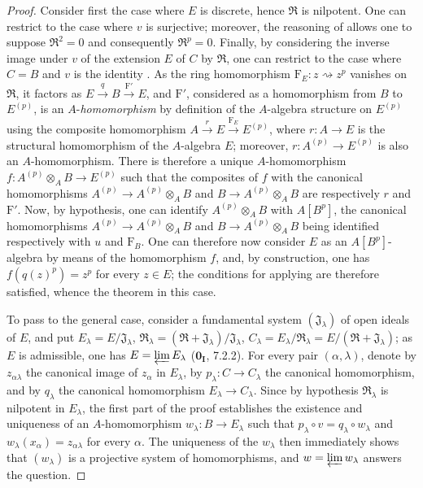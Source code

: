 \begin{proof}
Consider first the case where $E$ is discrete, hence $\mathfrak{R}$ is nilpotent.
One can restrict to the case where $v$ is surjective; moreover, the reasoning of
 allows one to suppose $\mathfrak{R}^2=0$ and consequently
$\mathfrak{R}^p=0$. Finally, by considering the inverse image under $v$ of the
extension $E$ of $C$ by $\mathfrak{R}$, one can restrict to the case where $C=B$
and $v$ is the identity . As the ring homomorphism
$\mathrm{F}_E:z\rightsquigarrow z^p$ vanishes on $\mathfrak{R}$, it factors as
$E\xrightarrow q B\xrightarrow{\mathrm{F}'}E$, and $\mathrm{F}'$, considered as a
homomorphism from $B$ to $E^{(p)}$, is an $A$-\emph{homomorphism} by definition
of the $A$-algebra structure on $E^{(p)}$ using the composite homomorphism
$A\xrightarrow r E\xrightarrow{\mathrm{F}_E}E^{(p)}$, where $r:A\to E$ is the
structural homomorphism of the $A$-algebra $E$; moreover,
$r:A^{(p)}\to E^{(p)}$ is also an $A$-homomorphism. There is therefore a unique
$A$-homomorphism $f:A^{(p)}\otimes_A B\to E^{(p)}$ such that the composites of $f$
with the canonical homomorphisms $A^{(p)}\to A^{(p)}\otimes_A B$ and
$B\to A^{(p)}\otimes_A B$ are respectively $r$ and $\mathrm{F}'$. Now, by hypothesis,
one can identify $A^{(p)}\otimes_A B$ with $A[B^p]$, the canonical homomorphisms
$A^{(p)}\to A^{(p)}\otimes_A B$ and $B\to A^{(p)}\otimes_A B$ being identified
respectively with $u$ and $\mathrm{F}_B$. One can therefore now consider $E$
as an $A[B^p]$-algebra by means of the homomorphism $f$, and, by construction,
one has $f(q(z)^p)=z^p$ for every $z\in E$; the conditions for applying
 are therefore satisfied, whence the theorem in this case.

To pass to the general case, consider a fundamental system
$(\mathfrak{J}_\lambda)$ of open ideals of $E$, and put
$E_\lambda=E/\mathfrak{J}_\lambda$,
$\mathfrak{R}_\lambda=(\mathfrak{R}+\mathfrak{J}_\lambda)/\mathfrak{J}_\lambda$,
$C_\lambda=E_\lambda/\mathfrak{R}_\lambda=E/(\mathfrak{R}+\mathfrak{J}_\lambda)$;
as $E$ is admissible, one has $E=\varprojlim E_\lambda$ ($\mathbf{0_I}$, 7.2.2).
For every pair $(\alpha,\lambda)$, denote by $z_{\alpha\lambda}$ the canonical
image of $z_\alpha$ in $E_\lambda$, by $p_\lambda:C\to C_\lambda$ the canonical
homomorphism,
and by $q_\lambda$ the canonical homomorphism $E_\lambda\to C_\lambda$.
Since by hypothesis $\mathfrak{R}_\lambda$ is nilpotent in $E_\lambda$, the first
part of the proof establishes the existence and uniqueness of an
$A$-homomorphism $w_\lambda:B\to E_\lambda$ such that
$p_\lambda\circ v=q_\lambda\circ w_\lambda$ and
$w_\lambda(x_\alpha)=z_{\alpha\lambda}$ for every $\alpha$.
The uniqueness of the $w_\lambda$ then immediately shows that $(w_\lambda)$ is a
projective system of homomorphisms, and $w=\varprojlim w_\lambda$ answers the
question.
\end{proof}

